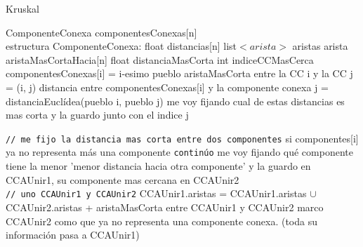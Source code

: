 \documentclass[11pt, a4paper, twoside]{article}
\begin{document}
\begin{algorithm}[H]
\caption{Kruskal}\label{alg:ej2-kruskal}
\footnotesize\begin{algorithmic}[1]

\State ComponenteConexa componentesConexas[n] 
\\
\State estructura ComponenteConexa: 
\State \hspace{0.15cm} float distancias[n]
\State \hspace{0.15cm} list$<arista>$ aristas
\State \hspace{0.15cm} arista aristaMasCortaHacia[n]
\State \hspace{0.15cm} float distanciaMasCorta
\State \hspace{0.15cm} int indiceCCMasCerca
\\

  
	\Statex \hspace{0.5cm} componentesConexas[i] = i-esimo pueblo 
        
        \State aristaMasCorta entre la CC i y la CC j = (i, j) 
        \State distancia entre componentesConexas[i] y la componente conexa j = distanciaEuclídea(pueblo i, pueblo j)  
        \State me voy fijando cual de estas distancias es mas corta y la guardo junto con el indice j  
	\EndFor
\EndFor
\\

  

	\Statex \hspace{0.5cm} \texttt{// me fijo la distancia mas corta entre dos componentes}
       
        \Statex \hspace{0.9cm}si componentes[i] ya no representa más una componente \texttt{continúo}
        \State me voy fijando qué componente tiene la menor 'menor distancia hacia otra componente' 
		y la guardo en CCAUnir1, su componente mas cercana en CCAUnir2 
	\EndFor	
	\\
	
	\Statex \hspace{0.5cm} \texttt{// uno CCAUnir1 y CCAUnir2}
	\State CCAUnir1.aristas = CCAUnir1.aristas $\cup$ CCAUnir2.aristas + aristaMasCorta entre CCAUnir1 y CCAUnir2 
    \State marco CCAUnir2 como que ya no representa una componente conexa. (toda su información pasa a CCAUnir1)  
	\\
	

\end{algorithmic}
\end{algorithm}
\end{document}
